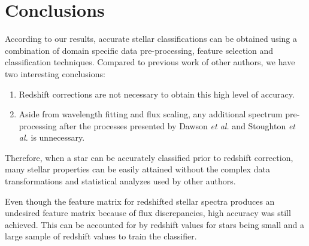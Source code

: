 \documentclass[conference]{IEEEtran}
\begin{document}
\section{Conclusions}\label{sec:conclusion}

According to our results, accurate stellar classifications can be obtained using a combination of domain specific data pre-processing, feature selection  and classification techniques. Compared to previous work of other authors, we have two interesting conclusions:

\begin{enumerate}
	\item Redshift corrections are not necessary to obtain this high level of accuracy.
	\item Aside from wavelength fitting and flux scaling, any additional spectrum pre-processing after the processes presented by Dawson \textit{et al.} \cite{Dawson} and Stoughton \textit{et al.} \cite{Stoughton} is unnecessary. 
\end{enumerate}

Therefore, when a star can be accurately classified prior to redshift correction, many stellar properties can be easily attained without the complex data transformations and statistical analyzes used by other authors. 


Even though the feature matrix for redshifted stellar spectra produces an undesired feature matrix because of flux discrepancies, high accuracy was still achieved. This can be accounted for by redshift values for stars being small and a large sample of redshift values to train the classifier.





\raggedright


\end{document}
